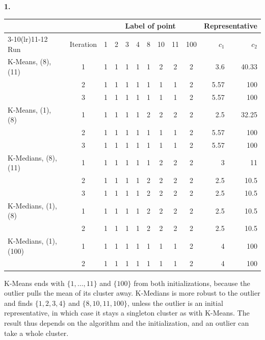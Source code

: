 \documentclass[a4paper,12pt]{article}
\begin{document}
\textbf{1.}\par\nopagebreak
\begin{tabular}{lcccccccccrr}
\toprule
 & & \multicolumn{8}{c}{Label of point} & \multicolumn{2}{c}{Representative} \\
\cmidrule(lr){3-10}\cmidrule(lr){11-12}
Run & Iteration & 1 & 2 & 3 & 4 & 8 & 10 & 11 & 100 & $c_1$ & $c_2$ \\
\midrule
K-Means, (8), (11) & 1 & 1 & 1 & 1 & 1 & 1 & 2 & 2 & 2 & 3.6 & 40.33 \\
 & 2 & 1 & 1 & 1 & 1 & 1 & 1 & 1 & 2 & 5.57 & 100 \\
 & 3 & 1 & 1 & 1 & 1 & 1 & 1 & 1 & 2 & 5.57 & 100 \\
\midrule
K-Means, (1), (8) & 1 & 1 & 1 & 1 & 1 & 2 & 2 & 2 & 2 & 2.5 & 32.25 \\
 & 2 & 1 & 1 & 1 & 1 & 1 & 1 & 1 & 2 & 5.57 & 100 \\
 & 3 & 1 & 1 & 1 & 1 & 1 & 1 & 1 & 2 & 5.57 & 100 \\
\midrule
K-Medians, (8), (11) & 1 & 1 & 1 & 1 & 1 & 1 & 2 & 2 & 2 & 3 & 11 \\
 & 2 & 1 & 1 & 1 & 1 & 2 & 2 & 2 & 2 & 2.5 & 10.5 \\
 & 3 & 1 & 1 & 1 & 1 & 2 & 2 & 2 & 2 & 2.5 & 10.5 \\
\midrule
K-Medians, (1), (8) & 1 & 1 & 1 & 1 & 1 & 2 & 2 & 2 & 2 & 2.5 & 10.5 \\
 & 2 & 1 & 1 & 1 & 1 & 2 & 2 & 2 & 2 & 2.5 & 10.5 \\
\midrule
K-Medians, (1), (100) & 1 & 1 & 1 & 1 & 1 & 1 & 1 & 1 & 2 & 4 & 100 \\
 & 2 & 1 & 1 & 1 & 1 & 1 & 1 & 1 & 2 & 4 & 100 \\
\bottomrule
\end{tabular}

K-Means ends with $\{1,\dots,11\}$ and $\{100\}$ from both initializations,
because the outlier pulls the mean of its cluster away. K-Medians is more
robust to the outlier and finds $\{1,2,3,4\}$ and $\{8,10,11,100\}$, unless
the outlier is an initial representative, in which case it stays a
singleton cluster as with K-Means. The result thus depends on the algorithm
and the initialization, and an outlier can take a whole cluster.
\end{document}
